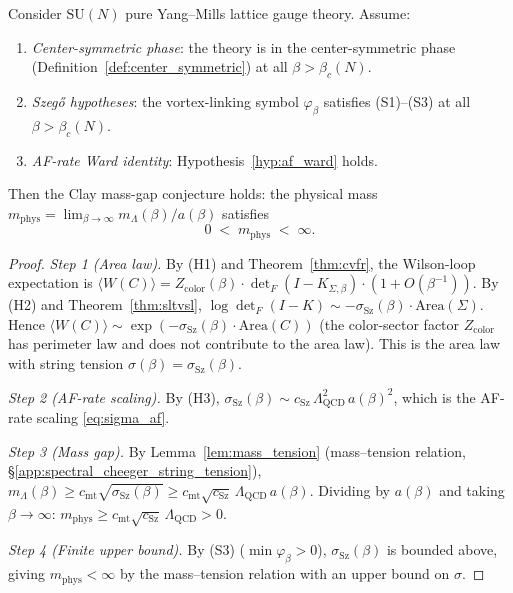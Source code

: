 \begin{theorem}
\label{thm:clay_from_szego}
Consider $\mathrm{SU}(N)$ pure Yang--Mills lattice gauge theory.
Assume:
\begin{enumerate}
\item[\textbf{(H1)}] \emph{Center-symmetric phase}: the theory is
in the center-symmetric phase
(Definition~\ref{def:center_symmetric}) at all
$\beta>\beta_{c}(N)$.
\item[\textbf{(H2)}] \emph{Szeg\H{o} hypotheses}: the
vortex-linking symbol $\varphi_{\beta}$ satisfies (S1)--(S3) at
all $\beta>\beta_{c}(N)$.
\item[\textbf{(H3)}] \emph{AF-rate Ward identity}:
Hypothesis~\ref{hyp:af_ward} holds.
\end{enumerate}
Then the Clay mass-gap conjecture holds: the physical mass
$m_{\mathrm{phys}}=\lim_{\beta\to\infty}m_{\Lambda}(\beta)/a(\beta)$
satisfies
\begin{equation}
\label{eq:clay_conclusion}
  0\;<\;m_{\mathrm{phys}}\;<\;\infty.
\end{equation}
\end{theorem}

\begin{proof}
\emph{Step 1 (Area law).} By (H1) and Theorem~\ref{thm:cvfr},
the Wilson-loop expectation is
$\langle W(C)\rangle=Z_{\mathrm{color}}(\beta)\cdot
\det_{F}(I-K_{\Sigma,\beta})\cdot(1+O(\beta^{-1}))$.
By (H2) and Theorem~\ref{thm:sltvsl},
$\log\det_{F}(I-K)\sim-\sigma_{\mathrm{Sz}}(\beta)\cdot
\mathrm{Area}(\Sigma)$. Hence
$\langle W(C)\rangle\sim\exp(-\sigma_{\mathrm{Sz}}(\beta)\cdot
\mathrm{Area}(C))$ (the color-sector factor $Z_{\mathrm{color}}$
has perimeter law and does not contribute to the area law). This is
the area law with string tension
$\sigma(\beta)=\sigma_{\mathrm{Sz}}(\beta)$.

\emph{Step 2 (AF-rate scaling).} By (H3),
$\sigma_{\mathrm{Sz}}(\beta)\sim c_{\mathrm{Sz}}\,
\Lambda_{\mathrm{QCD}}^{2}\,a(\beta)^{2}$, which is the AF-rate
scaling \eqref{eq:sigma_af}.

\emph{Step 3 (Mass gap).} By Lemma~\ref{lem:mass_tension}
(mass--tension relation,
\S\ref{app:spectral_cheeger_string_tension}),
$m_{\Lambda}(\beta)\ge c_{\mathrm{mt}}\sqrt{\sigma_{\mathrm{Sz}}(\beta)}
\ge c_{\mathrm{mt}}\sqrt{c_{\mathrm{Sz}}}\,\Lambda_{\mathrm{QCD}}\,
a(\beta)$. Dividing by $a(\beta)$ and taking
$\beta\to\infty$:
$m_{\mathrm{phys}}\ge c_{\mathrm{mt}}\sqrt{c_{\mathrm{Sz}}}\,
\Lambda_{\mathrm{QCD}}>0$.

\emph{Step 4 (Finite upper bound).} By (S3)
($\min\varphi_{\beta}>0$), $\sigma_{\mathrm{Sz}}(\beta)$ is
bounded above, giving $m_{\mathrm{phys}}<\infty$ by the
mass--tension relation with an upper bound on $\sigma$.
\end{proof}

